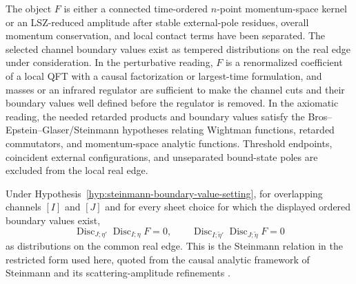 \begin{hypothesis}
\label{hyp:steinmann-boundary-value-setting}
The object \(F\) is either a connected time-ordered \(n\)-point momentum-space
kernel or an LSZ-reduced amplitude after stable external-pole residues,
overall momentum conservation, and local contact terms have been separated.
The selected channel boundary values exist as tempered distributions on the
real edge under consideration.  In the perturbative reading, \(F\) is a
renormalized coefficient of a local QFT with a causal factorization or
largest-time formulation, and masses or an infrared regulator are sufficient to
make the channel cuts and their boundary values well defined before the
regulator is removed.  In the axiomatic reading, the needed retarded products
and boundary values satisfy the Bros--Epstein--Glaser/Steinmann hypotheses
relating Wightman functions, retarded commutators, and momentum-space analytic
functions.  Threshold endpoints, coincident external configurations, and
unseparated bound-state poles are excluded from the local real edge.
\end{hypothesis}

\begin{quotedtheorem}
\label{qthm:steinmann-overlapping-channel-relation}
Under Hypothesis~\ref{hyp:steinmann-boundary-value-setting}, for overlapping
channels \([I]\) and \([J]\) and for every sheet choice for which the displayed
ordered boundary values exist,
\begin{equation}
  \operatorname{Disc}_{J;\eta'}
  \operatorname{Disc}_{I;\eta}F
  =
  0,
  \qquad
  \operatorname{Disc}_{I;\tilde\eta'}
  \operatorname{Disc}_{J;\tilde\eta}F
  =
  0
  \label{eq:steinmann-quoted-relation}
\end{equation}
as distributions on the common real edge.  This is the Steinmann relation in
the restricted form used here, quoted from the causal analytic framework of
Steinmann and its scattering-amplitude refinements
\cite{Steinmann1960I,Steinmann1960II,Stapp1971,CahillStapp1973,CahillStapp1975}.
\end{quotedtheorem}

